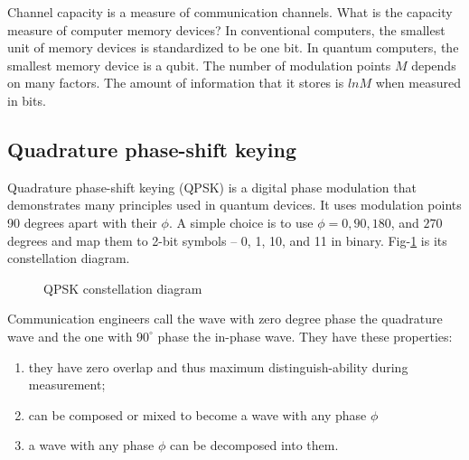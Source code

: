 \documentclass[oneside, letter, 12pt]{book}
\begin{document}
Channel capacity is a measure of communication channels. What is the capacity measure of computer memory devices? In conventional computers, the smallest unit of memory devices is standardized to be one bit. In quantum computers, the smallest memory device is a qubit. The number of modulation points $M$ depends on many factors. The amount of information that it stores is $ln M$ when measured in bits.

\subsection{Quadrature phase-shift keying}
Quadrature phase-shift keying (QPSK) is a digital phase modulation that demonstrates many principles used in quantum devices. It uses modulation points 90 degrees apart with their $\phi$. A simple choice is to use $\phi = 0, 90, 180$, and $270$ degrees and map them to 2-bit symbols -- 0, 1, 10, and 11 in binary. Fig-\ref{QPSK} is its constellation diagram.

\begin{figure}[h]\label{QPSK}
\caption{QPSK constellation diagram}
\end{figure}

Communication engineers call the wave with zero degree phase the quadrature wave and the one with $90^\circ$ phase the in-phase wave. They have these properties:
\begin{enumerate}\label{l-Hilbert}
    \item they have zero overlap and thus maximum distinguish-ability during measurement;
\item can be composed or mixed to become a wave with any phase $\phi$
\item a wave with any phase $\phi$ can be decomposed into them.
\end{enumerate}
\end{document}
